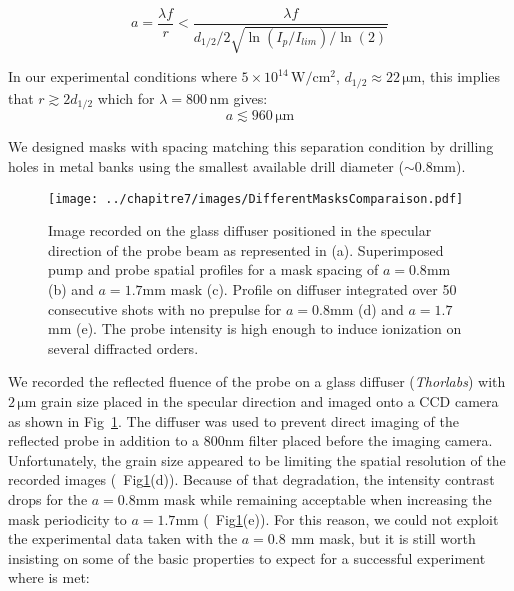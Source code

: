 \begin{equation}
a= \frac{\lambda f}{r} < \frac{\lambda f}{d_{1/2}/2\sqrt{\ln(I_p/I_{lim})/\ln(2)}}
\end{equation}

\noindent In our experimental conditions where $5\times 10^{14}\,\mathrm{W/cm^2}$, $d_{1/2} \approx 22\,\mathrm{\mu m}$, this implies that $ r \gtrsim 2 d_{1/2}$ which for $\lambda = 800\,\mathrm{nm}$ gives:
$$
a \lesssim 960 \,\mathrm{\mu m}
$$

\noindent We designed masks with spacing matching this separation condition by drilling holes in metal banks using the smallest available drill diameter ($\sim 0.8\mathrm{mm}$). 

\begin{figure}[H]
\centering
\texttt{[image: ../chapitre7/images/DifferentMasksComparaison.pdf]}\\
\caption{\label{fig:DifferentMasksComparaison} Image recorded on the glass diffuser positioned in the specular direction of the probe beam as represented in (a). Superimposed pump and probe spatial profiles for a mask spacing of $a=0.8$mm (b) and $a=1.7$mm mask (c). Profile on diffuser integrated over 50 consecutive shots with no prepulse for $a=0.8$mm (d) and $a=1.7$mm (e). The probe intensity is high enough to induce ionization on several diffracted orders.}
\end{figure}


\noindent We recorded the reflected fluence of the probe on a glass diffuser (\textit{Thorlabs}) with $2\,\mathrm{\mu m}$ grain size placed in the specular direction and imaged onto a CCD camera as shown in Fig~\ref{fig:DifferentMasksComparaison}. The diffuser was used to prevent direct imaging of the reflected probe in addition to a 800nm filter placed before the imaging camera. Unfortunately, the grain size appeared to be limiting the spatial resolution of the recorded images (~Fig\ref{fig:DifferentMasksComparaison}(d)). Because of that degradation, the intensity contrast drops for the $a=0.8$mm mask while remaining acceptable when increasing the mask periodicity to $a= 1.7$mm (~Fig\ref{fig:DifferentMasksComparaison}(e)). For this reason, we could not exploit the experimental data taken with the $a=0.8~\,\mathrm{mm}$ mask, but it is still worth insisting on some of the basic properties to expect for a successful experiment where  is met:\\



